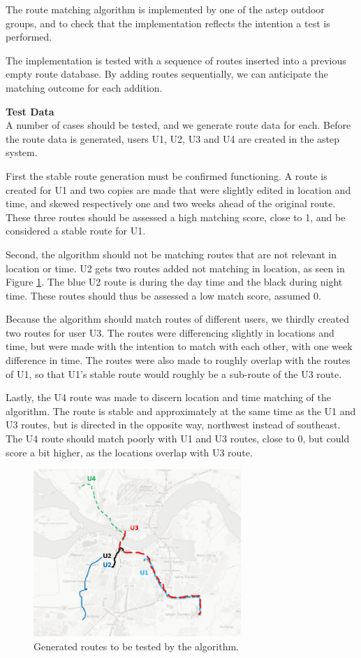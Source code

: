 The route matching algorithm is implemented by one of the \gls{astep} outdoor groups, and to check that the implementation reflects the intention a test is performed.

The implementation is tested with a sequence of routes inserted into a previous empty route database.
By adding routes sequentially, we can anticipate the matching outcome for each addition.


\textbf{Test Data}\\
A number of cases should be tested, and we generate route data for each. 
Before the route data is generated, users U1, U2, U3 and U4 are created in the \gls{astep} system.

First the stable route generation must be confirmed functioning.
A route is created for U1 and two copies are made that were slightly edited in location and time, and skewed respectively one and two weeks ahead of the original route.
These three routes should be assessed a high matching score, close to 1, and be considered a stable route for U1.

Second, the algorithm should not be matching routes that are not relevant in location or time.
U2 gets two routes added not matching in location, as seen in Figure \ref{fig:algroutes}.
The blue U2 route is during the day time and the black during night time.
These routes should thus be assessed a low match score, assumed 0.

Because the algorithm should match routes of different users, we thirdly created two routes for user U3.
The routes were differencing slightly in locations and time, but were made with the intention to match with each other, with one week difference in time.
The routes were also made to roughly overlap with the routes of U1, so that U1's stable route would roughly be a sub-route of the U3 route.

Lastly, the U4 route was made to discern location and time matching of the algorithm.
The route is stable and approximately at the same time as the U1 and U3 routes, but is directed in the opposite way, northwest instead of southeast.
The U4 route should match poorly with U1 and U3 routes, close to 0, but could score a bit higher, as the locations overlap with U3 route.

\begin{figure}[h]
	\centering
	\includegraphics[width=0.7\textwidth]{figures/algorithmroutes.png}
	\caption{Generated routes to be tested by the algorithm.}
	\label{fig:algroutes}
\end{figure}


